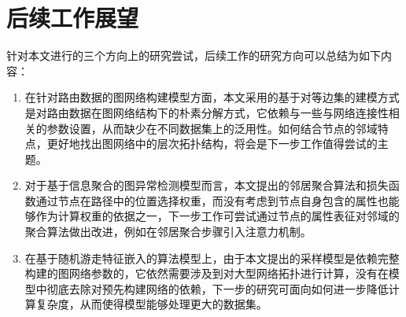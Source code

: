 \section{后续工作展望}

针对本文进行的三个方向上的研究尝试，后续工作的研究方向可以总结为如下内容：

\begin{enumerate}
    \item 在针对路由数据的图网络构建模型方面，本文采用的基于对等边集的建模方式是对路由数据在图网络结构下的朴素分解方式，它依赖与一些与网络连接性相关的参数设置，从而缺少在不同数据集上的泛用性。如何结合节点的邻域特点，更好地找出图网络中的层次拓扑结构，将会是下一步工作值得尝试的主题。
    \item 对于基于信息聚合的图异常检测模型而言，本文提出的邻居聚合算法和损失函数通过节点在路径中的位置选择权重，而没有考虑到节点自身包含的属性也能够作为计算权重的依据之一，下一步工作可尝试通过节点的属性表征对邻域的聚合算法做出改进，例如在邻居聚合步骤引入注意力机制。
    \item 在基于随机游走特征嵌入的算法模型上，由于本文提出的采样模型是依赖完整构建的图网络参数的，它依然需要涉及到对大型网络拓扑进行计算，没有在模型中彻底去除对预先构建网络的依赖，下一步的研究可面向如何进一步降低计算复杂度，从而使得模型能够处理更大的数据集。
\end{enumerate}


